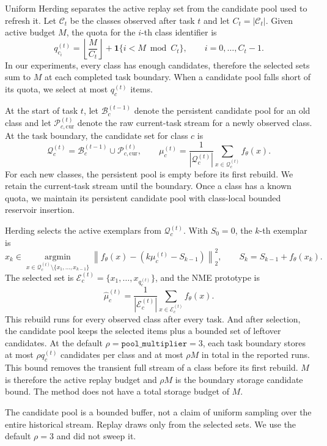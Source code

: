 Uniform Herding separates the active replay set from the candidate pool used
to refresh it.  Let $\mathcal{C}_t$ be the classes observed after task $t$ and
let $C_t=|\mathcal{C}_t|$.  Given active budget $M$, the quota for the $i$-th
class identifier is
\[
q_{c_i}^{(t)}=
\left\lfloor\frac{M}{C_t}\right\rfloor
+\mathbf{1}\{i<M\bmod C_t\},
\qquad i=0,\ldots,C_t-1.
\]
In our experiments, every class has enough candidates, therefore the selected sets sum
to $M$ at each completed task boundary.  When a candidate pool falls short of its
quota, we select at most $q_c^{(t)}$ items.

At the start of task $t$, let $\mathcal{B}_c^{(t-1)}$ denote the persistent
candidate pool for an old class and let $\mathcal{P}_{c,\mathrm{cur}}^{(t)}$
denote the raw current-task stream for a newly observed class.  At the task
boundary, the candidate set for class $c$ is
\[
\mathcal{Q}_c^{(t)}=
\mathcal{B}_c^{(t-1)}\cup\mathcal{P}_{c,\mathrm{cur}}^{(t)},
\qquad
\mu_c^{(t)}=\frac{1}{|\mathcal{Q}_c^{(t)}|}
\sum_{x\in\mathcal{Q}_c^{(t)}}f_\theta(x).
\]
For each new classes, the persistent pool is empty before its first rebuild.  We
retain the current-task stream until the boundary. Once a class has a known
quota, we maintain its persistent candidate pool with class-local bounded reservoir
insertion.

Herding selects the active exemplars from $\mathcal{Q}_c^{(t)}$.  With
$S_0=0$, the $k$-th exemplar is
\[
x_k\in\operatorname*{argmin}_{x\in\mathcal{Q}_c^{(t)}\setminus
\{x_1,\ldots,x_{k-1}\}}
\left\|f_\theta(x)-\left(k\mu_c^{(t)}-S_{k-1}\right)\right\|_2^2,
\qquad S_k=S_{k-1}+f_\theta(x_k).
\]
The selected set is $\mathcal{E}_c^{(t)}=\{x_1,\ldots,x_{q_c^{(t)}}\}$, and
the NME prototype is
\[
\hat\mu_c^{(t)}=\frac{1}{|\mathcal{E}_c^{(t)}|}
\sum_{x\in\mathcal{E}_c^{(t)}}f_\theta(x).
\]
This rebuild runs for every observed class after every task.
And after selection, the candidate pool keeps the selected items plus a bounded
set of leftover candidates.  At the default
$\rho=\texttt{pool\_multiplier}=3$, each task boundary stores at most $\rho
q_c^{(t)}$ candidates per class and at most $\rho M$ in total in the reported runs.  This bound
removes the transient full stream of a class before its first rebuild.
$M$ is therefore the active replay budget and $\rho M$ is the boundary
storage candidate bound. The method does not have a total storage budget of $M$.

The candidate pool is a bounded buffer, not a claim of uniform sampling over
the entire historical stream.  Replay draws only from the selected sets.  We use the
default $\rho=3$ and did not sweep it.

